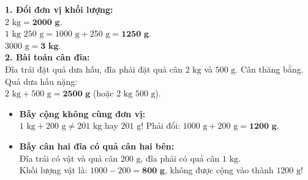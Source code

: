 \documentclass[11pt,a4paper]{article}
\begin{document}
\vspace{-2.5mm}
\noindent
\begin{minipage}[t]{0.49\textwidth}\vspace{0pt}
\begin{tcolorbox}[
  enhanced,
  colback=green!4!white,
  colframe=green!60!black,
  arc=2mm, boxrule=0.8pt,
  left=2mm, right=2mm, top=1.8mm, bottom=1.8mm,
  title={\footnotesize\bfseries\color{white}\faCheckCircle\ Ví dụ thực hành chuẩn mực}
]
{\footnotesize
\textbf{1. Đổi đơn vị khối lượng:}\\
$2\text{ kg} = \mathbf{2000\text{ g}}$.\\
$1\text{ kg } 250\text{ g} = 1000\text{ g} + 250\text{ g} = \mathbf{1250\text{ g}}$.\\
$3000\text{ g} = \mathbf{3\text{ kg}}$.\\
\textbf{2. Bài toán cân đĩa:}\\
Đĩa trái đặt quả dưa hấu, đĩa phải đặt quả cân $2\text{ kg}$ và $500\text{ g}$. Cân thăng bằng. Quả dưa hấu nặng:\\
$2\text{ kg} + 500\text{ g} = \mathbf{2500\text{ g}}$ (hoặc $2\text{ kg } 500\text{ g}$).
}
\end{tcolorbox}
\end{minipage}
\hfill
\begin{minipage}[t]{0.49\textwidth}\vspace{0pt}
\begin{tcolorbox}[
  enhanced,
  colback=red!4!white,
  colframe=red!70!black,
  arc=2mm, boxrule=0.8pt,
  left=2mm, right=2mm, top=1.8mm, bottom=1.8mm,
  title={\footnotesize\bfseries\color{white}\faExclamationTriangle\ Mẹo tránh bẫy trắc nghiệm}
]
{\footnotesize
\begin{itemize}\setlength{\itemsep}{1.5pt}\setlength{\leftskip}{-2.5mm}
  \item \textbf{Bẫy cộng không cùng đơn vị:}\\
  $1\text{ kg} + 200\text{ g} \ne 201\text{ kg}$ hay $201\text{ g}$! Phải đổi: $1000\text{ g} + 200\text{ g} = \mathbf{1200\text{ g}}$.
  \item \textbf{Bẫy cân hai đĩa có quả cân hai bên:}\\
  Đĩa trái có vật và quả cân $200\text{ g}$, đĩa phải có quả cân $1\text{ kg}$.\\
  Khối lượng vật là: $1000 - 200 = \mathbf{800\text{ g}}$, không được cộng vào thành $1200\text{ g}$!
\end{itemize}
}
\end{tcolorbox}
\end{minipage}
\end{document}
